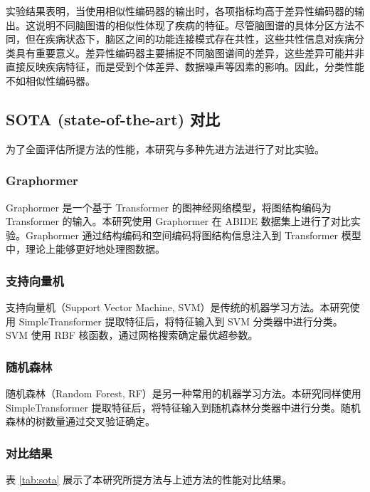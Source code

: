 \documentclass[12pt,a4paper]{article}
\begin{document}
实验结果表明，当使用相似性编码器的输出时，各项指标均高于差异性编码器的输出。这说明不同脑图谱的相似性体现了疾病的特征。尽管脑图谱的具体分区方法不同，但在疾病状态下，脑区之间的功能连接模式存在共性，这些共性信息对疾病分类具有重要意义。差异性编码器主要捕捉不同脑图谱间的差异，这些差异可能并非直接反映疾病特征，而是受到个体差异、数据噪声等因素的影响。因此，分类性能不如相似性编码器。

\subsection{SOTA (state-of-the-art) 对比}

为了全面评估所提方法的性能，本研究与多种先进方法进行了对比实验。

\subsubsection{Graphormer}

Graphormer 是一个基于 Transformer 的图神经网络模型，将图结构编码为 Transformer 的输入\cite{ying2021transformers}。本研究使用 Graphormer 在 ABIDE 数据集上进行了对比实验。Graphormer 通过结构编码和空间编码将图结构信息注入到 Transformer 模型中，理论上能够更好地处理图数据。

\subsubsection{支持向量机}

支持向量机（Support Vector Machine, SVM）是传统的机器学习方法\cite{cortes1995support}。本研究使用 SimpleTransformer 提取特征后，将特征输入到 SVM 分类器中进行分类。SVM 使用 RBF 核函数，通过网格搜索确定最优超参数。

\subsubsection{随机森林}

随机森林（Random Forest, RF）是另一种常用的机器学习方法\cite{breiman2001random}。本研究同样使用 SimpleTransformer 提取特征后，将特征输入到随机森林分类器中进行分类。随机森林的树数量通过交叉验证确定。

\subsubsection{对比结果}

表 \ref{tab:sota} 展示了本研究所提方法与上述方法的性能对比结果。
\end{document}
